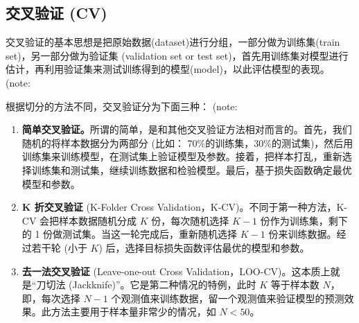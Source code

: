 \subsection{交叉验证 (CV)}\label{sec:lasso-lambda-cv}
交叉验证的基本思想是把原始数据(dataset)进行分组，一部分做为训练集(train set)，另一部分做为验证集 (validation set or test set)，首先用训练集对模型进行估计，再利用验证集来测试训练得到的模型(model)，以此评估模型的表现。 (note: %


根据切分的方法不同，交叉验证分为下面三种： (note: %

\begin{enumerate}
\item \textbf{简单交叉验证。}所谓的简单，是和其他交叉验证方法相对而言的。首先，我们随机的将样本数据分为两部分 (比如： 70\%的训练集，30\%的测试集)，然后用训练集来训练模型，在测试集上验证模型及参数。接着，把样本打乱，重新选择训练集和测试集，继续训练数据和检验模型。最后，基于损失函数确定最优模型和参数。
\item \textbf{K 折交叉验证} (K-Folder Cross Validation，K-CV)。不同于第一种方法，K-CV 会把样本数据随机分成 $K$ 份，每次随机选择 $K-1$ 份作为训练集，剩下的 1 份做测试集。当这一轮完成后，重新随机选择 $K-1$ 份来训练数据。经过若干轮 (小于 $K$) 后，选择目标损失函数评估最优的模型和参数。
\item \textbf{去一法交叉验证} (Leave-one-out Cross Validation，LOO-CV)。这本质上就是“刀切法 (Jackknife)”。它是第二种情况的特例，此时 $K$ 等于样本数 $N$，即，每次选择 $N-1$ 个观测值来训练数据，留一个观测值来验证模型的预测效果。此方法主要用于样本量非常少的情况，如 $N<50$。
\end{enumerate}

